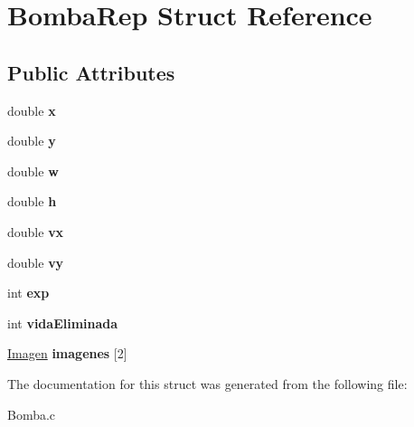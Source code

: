 \hypertarget{struct_bomba_rep}{}\section{Bomba\+Rep Struct Reference}
\label{struct_bomba_rep}
\subsection*{Public Attributes}
\begin{DoxyCompactItemize}
\item 
\mbox{\label{struct_bomba_rep_a14865d5c576248d6c50dd0f7d8c7ca0a}} 
double {\bfseries x}
\item 
\mbox{\label{struct_bomba_rep_a8aba7615e7bfe747c9e0e501dd1a10e0}} 
double {\bfseries y}
\item 
\mbox{\label{struct_bomba_rep_a96bfe6d72f520069c842bea0547d02d6}} 
double {\bfseries w}
\item 
\mbox{\label{struct_bomba_rep_a38aae20808cd8420a91e960b2a1b2398}} 
double {\bfseries h}
\item 
\mbox{\label{struct_bomba_rep_abb608dee26680cd27cc2cb6c30c28101}} 
double {\bfseries vx}
\item 
\mbox{\label{struct_bomba_rep_a3e2c516033df2704aae8d42ad0b7aba6}} 
double {\bfseries vy}
\item 
\mbox{\label{struct_bomba_rep_a8181c644f362682c1775992fe9bde940}} 
int {\bfseries exp}
\item 
\mbox{\label{struct_bomba_rep_a22764b5910e80a4d792f6af2ab66f4a7}} 
int {\bfseries vida\+Eliminada}
\item 
\mbox{\label{struct_bomba_rep_aa0a979375d1954dcb00a439173ba5b5f}} 
\mbox{\hyperlink{_pantalla_8h_a768e3409329f2389c63495f1a1684379}{Imagen}} {\bfseries imagenes} \mbox{[}2\mbox{]}
\end{DoxyCompactItemize}


The documentation for this struct was generated from the following file\+:\begin{DoxyCompactItemize}
\item 
Bomba.\+c\end{DoxyCompactItemize}
